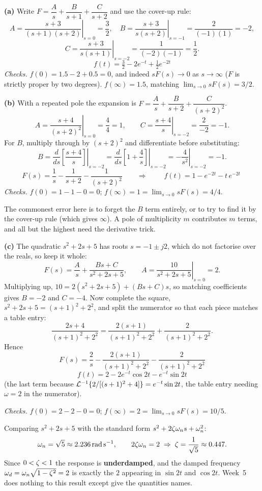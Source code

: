 \documentclass[11pt,a4paper]{article}
\begin{document}
\begin{solution}
\textbf{(a)} Write $F=\dfrac{A}{s}+\dfrac{B}{s+1}+\dfrac{C}{s+2}$ and use the
cover-up rule:
\[
  A=\left.\frac{s+3}{(s+1)(s+2)}\right|_{s=0}=\frac{3}{2},\quad
  B=\left.\frac{s+3}{s(s+2)}\right|_{s=-1}=\frac{2}{(-1)(1)}=-2,
\]
\[
  C=\left.\frac{s+3}{s(s+1)}\right|_{s=-2}=\frac{1}{(-2)(-1)}=\frac{1}{2}.
\]
\[
  \boxed{\;f(t)=\tfrac{3}{2}-2e^{-t}+\tfrac{1}{2}e^{-2t}\;}
\]
\emph{Checks.} $f(0)=1.5-2+0.5=0$, and indeed $sF(s)\to 0$ as $s\to\infty$
($F$ is strictly proper by two degrees). $f(\infty)=1.5$, matching
$\lim_{s\to 0}sF(s)=3/2$.

\medskip
\textbf{(b)} With a repeated pole the expansion is
$F=\dfrac{A}{s}+\dfrac{B}{s+2}+\dfrac{C}{(s+2)^{2}}$.
\[
  A=\left.\frac{s+4}{(s+2)^{2}}\right|_{s=0}=\frac{4}{4}=1,
  \qquad
  C=\left.\frac{s+4}{s}\right|_{s=-2}=\frac{2}{-2}=-1 .
\]
For $B$, multiply through by $(s+2)^{2}$ and differentiate before substituting:
\[
  B=\left.\frac{d}{ds}\!\left[\frac{s+4}{s}\right]\right|_{s=-2}
   =\left.\frac{d}{ds}\!\left[1+\frac{4}{s}\right]\right|_{s=-2}
   =\left.-\frac{4}{s^{2}}\right|_{s=-2}=-1 .
\]
\[
  F(s)=\frac{1}{s}-\frac{1}{s+2}-\frac{1}{(s+2)^{2}}
  \qquad\Longrightarrow\qquad
  \boxed{\;f(t)=1-e^{-2t}-t\,e^{-2t}\;}
\]
\emph{Checks.} $f(0)=1-1-0=0$; $f(\infty)=1=\lim_{s\to0}sF(s)=4/4$.

\begin{pitfall}
The commonest error here is to forget the $B$ term entirely, or to try to find
it by the cover-up rule (which gives $\infty$). A pole of multiplicity $m$
contributes $m$ terms, and all but the highest need the derivative trick.
\end{pitfall}

\medskip
\textbf{(c)} The quadratic $s^{2}+2s+5$ has roots $s=-1\pm j2$, which do not
factorise over the reals, so keep it whole:
\[
  F(s)=\frac{A}{s}+\frac{Bs+C}{s^{2}+2s+5},\qquad
  A=\left.\frac{10}{s^{2}+2s+5}\right|_{s=0}=2 .
\]
Multiplying up, $10=2(s^{2}+2s+5)+(Bs+C)s$, so matching coefficients gives
$B=-2$ and $C=-4$. Now complete the square, $s^{2}+2s+5=(s+1)^{2}+2^{2}$, and
split the numerator so that each piece matches a table entry:
\[
  \frac{2s+4}{(s+1)^{2}+2^{2}}
  =\frac{2(s+1)}{(s+1)^{2}+2^{2}}+\frac{2}{(s+1)^{2}+2^{2}} .
\]
Hence
\[
  F(s)=\frac{2}{s}-\frac{2(s+1)}{(s+1)^{2}+2^{2}}-\frac{2}{(s+1)^{2}+2^{2}}
\]
\[
  \boxed{\;f(t)=2-2e^{-t}\cos 2t-e^{-t}\sin 2t\;}
\]
(the last term because $\mathcal{L}^{-1}\{2/[(s+1)^{2}+4]\}=e^{-t}\sin 2t$, the table
entry needing $\omega=2$ in the numerator).

\emph{Checks.} $f(0)=2-2-0=0$; $f(\infty)=2=\lim_{s\to0}sF(s)=10/5$.

\medskip
Comparing $s^{2}+2s+5$ with the standard form $s^{2}+2\zeta\omega_{n} s+\omega_{n}^{2}$:
\[
  \omega_{n}=\sqrt{5}\approx\SI{2.236}{\radian\per\second},
  \qquad
  2\zeta\omega_{n}=2 \;\Rightarrow\; \zeta=\frac{1}{\sqrt{5}}\approx 0.447 .
\]
Since $0<\zeta<1$ the response is \textbf{underdamped}, and the damped frequency
$\omega_{d}=\omega_{n}\sqrt{1-\zeta^{2}}=2$ is exactly the $2$ appearing in
$\sin 2t$ and $\cos 2t$. Week~5 does nothing to this result except give the
quantities names.
\end{solution}
\end{document}

